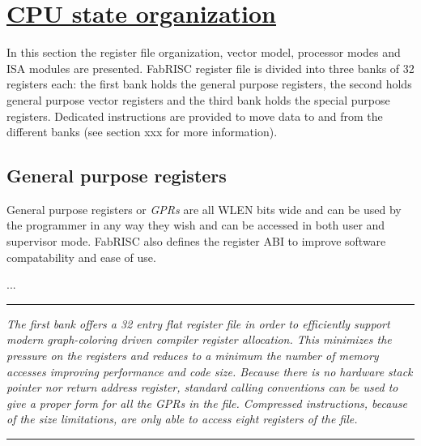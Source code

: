 \documentclass{article}
\begin{document}
    \section[CPU state organization]{\LARGE\underline{CPU state organization}}

        In this section the register file organization, vector model, processor modes and ISA modules are presented. FabRISC register file is divided into three banks of 32 registers each: the first bank holds the general purpose registers, the second holds general purpose vector registers and the third bank holds the special purpose registers. Dedicated instructions are provided to move data to and from the different banks (see section xxx for more information).

        \subsection{General purpose registers}

            General purpose registers or \textit{GPRs} are all WLEN bits wide and can be used by the programmer in any way they wish and can be accessed in both user and supervisor mode. FabRISC also defines the register ABI to improve software compatability and ease of use.

            \begin{itemize}

                ...

            \end{itemize}

        \par\noindent\rule{\textwidth}{0.4pt}
        \textit{The first bank offers a 32 entry flat register file in order to efficiently support modern graph-coloring driven compiler register allocation. This minimizes the pressure on the registers and reduces to a minimum the number of memory accesses improving performance and code size. Because there is no hardware stack pointer nor return address register, standard calling conventions can be used to give a proper form for all the GPRs in the file. Compressed instructions, because of the size limitations, are only able to access eight registers of the file.}
        \par\noindent\rule{\textwidth}{0.4pt}

    \clearpage
\end{document}
